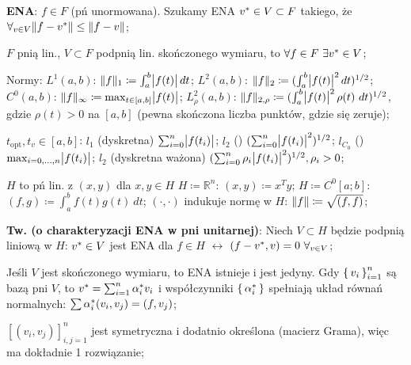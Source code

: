 
\entry
\textbf{ENA}:
$f \in F$
(pń unormowana).
Szukamy ENA
$v^{*} \in V \subset F$ takiego, że
$\forall_{v \in V} \|f - v^{*}\| \leq \|f-v\|$;

\entry
$F$ pnią lin.,
$V \subset F$ podpnią lin. skończonego wymiaru, to
$\forall{f \in F} \ \exists{\enain{v}{V}}$;

\entry
Normy:
\subentry
$L^1(a,b)$:
$\|f\|_1 \coloneqq \int^b_a\abs{f(t)} dt$;
\subentry
$L^2(a,b)$:
$\|f\|_2 \coloneqq (\int^b_a\abs{f(t)}^2 dt)^{1/2}$;
\subentry
$C^0(a,b)$:
$\|f\|_\infty \coloneqq \max_{t \in [a,b]} \abs{f(t)}$;
\subentry
$L^2_\rho(a,b)$:
$\|f\|_{2, \rho} \coloneqq (\int^b_a\abs{f(t)}^2 \rho(t) \ dt)^{1/2}$,
gdzie
$\rho(t) > 0$ na $[a,b]$
(pewna skończona liczba punktów, gdzie się zeruje);


\entry
$t_{\text{opt}}, t_v \in [a,b]$:
\subentry
$l_1$ (dyskretna)
$\sum^n_{i=0} \abs{f(t_i)}$;
\subentry
$l_2$ (\dittotikz)
$(\sum^n_{i=0} \abs{f(t_i)}^2)^{1/2}$;
\subentry
$l_{C_0}$ (\dittotikz)
$\max_{i = 0,\ldots,n} \abs{f(t_i)}$;
\subentry
$l_2$ (dyskretna ważona)
$(\sum^n_{i=0} \rho_i\abs{f(t_i)}^2)^{1/2}, \rho_i>0$;

\entry
$H$ to pń lin. z
$(x,y)$ dla $x, y \in H$
\subentry
$H \coloneqq \mathbb{R}^n$:
$(x,y) \coloneqq x^T y$;
\subentry
$H \coloneqq C^0[a;b]$:
$(f,g) \coloneqq \int^b_a f(t)g(t) \ dt$;
\subentry
$(\cdot, \cdot)$ indukuje normę w $H$:
$\|f\| \coloneqq \sqrt{(f,f)}$;

\entry
\textbf{Tw. (o charakteryzacji ENA w pni unitarnej)}:
Niech $V \subset H$ będzie podpnią liniową w $H$:
$v^{*} \in V$ jest ENA dla $f \in H$
$\leftrightarrow$
$(f - \ena{v}, v) = 0 \ \forallin{v}{V}$;

\entry
Jeśli $V$ jest skończonego wymiaru, to ENA istnieje i jest jedyny.
Gdy $\set{v_i}^n_{i=1}$ są bazą pni $V$, to
$v^{*} = \sum^n_{i=1} \alpha^{*}_i v_i$
i współczynniki $\set{\alpha^{*}_i}$
spełniają układ równań normalnych:
$\sum \alpha^{*}_i (v_i, v_j) = (f, v_j)$;

\entry
$[(v_i, v_j)]^n_{i,j=1}$
jest symetryczna i dodatnio określona (macierz Grama),
więc ma dokładnie 1 rozwiązanie;


